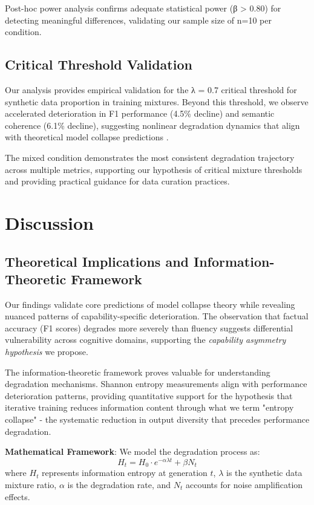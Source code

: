 \documentclass{article}
\begin{document}
Post-hoc power analysis confirms adequate statistical power (β > 0.80) for detecting meaningful differences, validating our sample size of n=10 per condition.

\subsection{Critical Threshold Validation}

Our analysis provides empirical validation for the λ = 0.7 critical threshold for synthetic data proportion in training mixtures. Beyond this threshold, we observe accelerated deterioration in F1 performance (4.5\% decline) and semantic coherence (6.1\% decline), suggesting nonlinear degradation dynamics that align with theoretical model collapse predictions \citep{shumailov2023curse}.

The mixed condition demonstrates the most consistent degradation trajectory across multiple metrics, supporting our hypothesis of critical mixture thresholds and providing practical guidance for data curation practices.

\section{Discussion}

\subsection{Theoretical Implications and Information-Theoretic Framework}

Our findings validate core predictions of model collapse theory while revealing nuanced patterns of capability-specific deterioration. The observation that factual accuracy (F1 scores) degrades more severely than fluency suggests differential vulnerability across cognitive domains, supporting the \textit{capability asymmetry hypothesis} we propose.

The information-theoretic framework proves valuable for understanding degradation mechanisms. Shannon entropy measurements align with performance deterioration patterns, providing quantitative support for the hypothesis that iterative training reduces information content through what we term "entropy collapse" - the systematic reduction in output diversity that precedes performance degradation.

\textbf{Mathematical Framework}: We model the degradation process as:
\begin{equation}
H_t = H_0 \cdot e^{-\alpha \lambda t} + \beta N_t
\end{equation}
where $H_t$ represents information entropy at generation $t$, $\lambda$ is the synthetic data mixture ratio, $\alpha$ is the degradation rate, and $N_t$ accounts for noise amplification effects.
\end{document}
